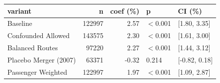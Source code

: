 \begin{tabular}{lrrll}
\toprule
variant & n & coef (\%) & p & CI (\%) \\
\midrule
Baseline & 122997 & 2.57 & $<$0.001 & [1.80, 3.35] \\
Confounded Allowed & 143575 & 2.30 & $<$0.001 & [1.61, 3.00] \\
Balanced Routes & 97220 & 2.27 & $<$0.001 & [1.44, 3.12] \\
Placebo Merger (2007) & 63371 & -0.32 & 0.214 & [-0.82, 0.18] \\
Passenger Weighted & 122997 & 1.97 & $<$0.001 & [1.09, 2.87] \\
\bottomrule
\end{tabular}
